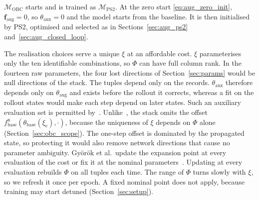 $\mathcal M_{\mathrm{OBC}}$ starts and is trained as $\mathcal M_{\mathrm{PS2}}$.
At the zero start \eqref{eq:aug_zero_init}, $\mathbf f_{\mathrm{aug}}=0$, so
$\theta_{\mathrm{aux}}=0$ and the model starts from the baseline.
It is then initialised by PS2, optimised and selected as in
Sections~\ref{sec:aug_ps2} and~\ref{sec:aug_closed_loop}.

The realisation choices serve a unique $\xi$ at an affordable cost.
$\xi$ parameterises only the ten identifiable combinations, so $\Phi$ can
have full column rank.
In the fourteen raw parameters, the four lost directions of
Section~\ref{sec:params} would be null directions of the stack.
The tuples depend only on the records.
$\theta_{\mathrm{aux}}$ therefore depends only on $\theta_{\mathrm{aug}}$ and
exists before the rollout it corrects, whereas a fit on the rollout states
would make each step depend on later states.
Such an auxiliary evaluation set is permitted by~\cite[Sec.~3.2]{gyorok2026obc}.
Unlike~\cite[Eq.~(18)]{gyorok2025l4dc}, the stack omits the offset
$f^{\mathrm n}_{\mathrm{base}}(\theta_{\mathrm{base}}(\xi_{\mathrm e}),\cdot)$,
because the uniqueness of $\xi$ depends on $\Phi$ alone
(Section~\ref{sec:obc_scope}).
The one-step offset is dominated by the propagated state, so protecting it
would also remove network directions that cause no parameter ambiguity.
Gy\"or\"ok et al.\ update the expansion point at every evaluation of the
cost or fix it at the nominal parameters~\cite[Sec.~4]{gyorok2025l4dc}.
Updating at every evaluation rebuilds $\Phi$ on all tuples each time.
The range of $\Phi$ turns slowly with $\xi$, so we refresh it once per epoch.
A fixed nominal point does not apply, because training may start detuned
(Section~\ref{sec:setup}).


